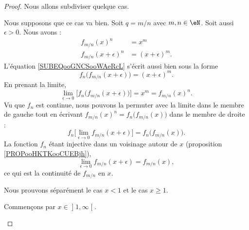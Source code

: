 \begin{proof}
	Nous allons subdiviser quelque cas.
	\begin{subproof}
		Nous supposons que ce cas va bien.      %
		Soit \( q=m/n\) avec \( m,n\in \eN\). Soit aussi \( \epsilon>0\). Nous avons :
		\begin{subequations}
			\begin{align}
				f_{m/n}(x)^n          & =x^m                                              \\
				f_{m/n}(x+\epsilon)^n & =(x+\epsilon)^m.      \label{SUBEQooGNCSooWAeRcL}
			\end{align}
		\end{subequations}
		L'équation \eqref{SUBEQooGNCSooWAeRcL} s'écrit aussi bien sous la forme
		\begin{equation}
			f_n\big( f_{m/n}(x+\epsilon) \big)=(x+\epsilon)^m.
		\end{equation}
		En prenant la limite,
		\begin{equation}
			\lim_{\epsilon\to 0}\big[ f_n\big( f_{m/n}(x+\epsilon) \big) \big]=x^m=f_{m/n}(x)^n.
		\end{equation}
		Vu que \( f_n\) est continue, nous pouvons la permuter avec la limite dans le membre de gauche tout en écrivant \( f_{m/n}(x)^n=f_n\big( f_{m/n}(x) \big)\) dans le membre de droite :
		\begin{equation}
			f_n\big[ \lim_{\epsilon\to 0}f_{m/n}(x+\epsilon) \big]=f_n\big( f_{m/n}(x) \big).
		\end{equation}
		La fonction \( f_n\) étant injective dans un voisinage autour de \( x\) (proposition \ref{PROPooHKTKooCUEBjh}),
		\begin{equation}
			\lim_{\epsilon\to 0}f_{m/n}(x+\epsilon)=f_{m/n}(x),
		\end{equation}
		ce qui est la continuité de \( f_{m/n}\) en \( x\).


		Nous prouvons séparément le cas \( x<1\) et le cas \( x\geq 1\). 

        \begin{subproof}

        Commençons par \( x\in \mathopen\rbrack 1 , \infty \mathclose\lbrack\).


\end{subproof}
\end{subproof}
\end{proof}
